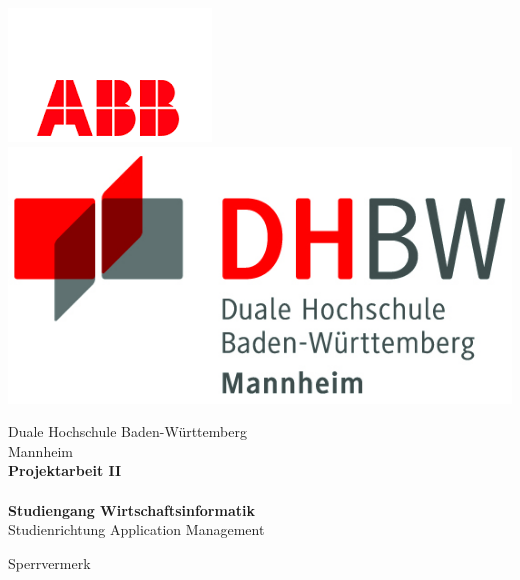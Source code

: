 \begin{titlepage}
\begin{minipage}{\textwidth}
		\vspace{-2cm}
		\noindent \includegraphics[scale=0.71]{img/firmenlogo.jpg} \hfill   \includegraphics{img/logo.jpg}
\end{minipage}
\vspace{1em}
\sffamily
\begin{center}
	\textsf{\large{}Duale Hochschule Baden-W\"urttemberg\\[1.5mm] Mannheim}\\[2em]
	\textsf{\textbf{\Large{}Projektarbeit II}}\\[3mm]
	\textsf{\textbf{\DerTitelDerArbeit}} \\[1.5cm]
	\textsf{\textbf{\Large{}Studiengang Wirtschaftsinformatik}\\[3mm] \textsf{Studienrichtung Application Management}}
	
	\vspace{3em}
	\textsf{\Large{Sperrvermerk}}
\vfill

\begin{minipage}{\textwidth}


\end{minipage}
\end{center}
\end{titlepage}
